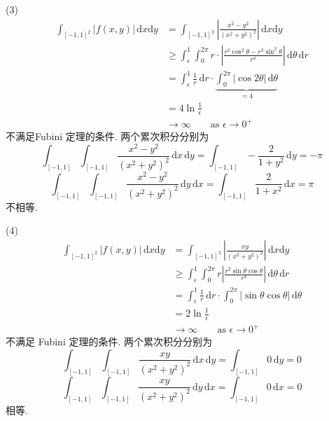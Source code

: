 (3)
\[
\begin{aligned}
\int_{[-1,1]^2}^{} \lvert f(x,y) \rvert  \, \mathrm{d}x \mathrm{d}y & =\int_{[-1,1]^2}^{} \left\lvert  \frac{x^2-y^2}{(x^2+y^2)^2}  \right\rvert  \, \mathrm{d}x \mathrm{d}y \\
 & \geq \int_{\epsilon}^{1} \int_{0}^{2\pi}   r \cdot \left\lvert  \frac{r^2\cos ^2\theta-r^2\sin ^2\theta}{r^{4}}  \right\rvert  \, \mathrm{d}\theta  \, \mathrm{d}r  \\
 & =\int_{\epsilon}^{1} \frac{1}{r} \, \mathrm{d}r \cdot\underbrace{  \int_{0}^{2\pi} \lvert \cos2\theta \rvert  \, \mathrm{d}\theta    }_{ =4  } \\
 & =4\ln\frac{1}{\epsilon} \\
 & \to \infty \qquad \text{as }\epsilon\to0^{+} 
\end{aligned} 
\]
不满足Fubini 定理的条件. 两个累次积分分别为
\[
\int_{[-1,1]}^{} \int_{[-1,1]}^{} \frac{x^2-y^2}{(x^2+y^2)^2} \, \mathrm{d}x  \, \mathrm{d}y =\int_{[-1,1]}^{} -\frac{2}{1+y^2} \, \mathrm{d}y= -\pi
\]
\[
\int_{[-1,1]}^{} \int_{[-1,1]}^{} \frac{x^2-y^2}{(x^2+y^2)^2} \, \mathrm{d}y  \, \mathrm{d}x=\int_{[-1,1]}^{} \frac{2}{1+x^2} \, \mathrm{d}x =\pi
\]
不相等.

(4)
\[
\begin{aligned}
\int_{[-1,1]^2}^{} \lvert f(x,y) \rvert  \, \mathrm{d}x \mathrm{d}y & =\int_{[-1,1]^2}^{} \left\lvert  \frac{xy}{(x^2+y^2)^2}  \right\rvert  \, \mathrm{d}x \mathrm{d}y \\
 & \geq \int_{\epsilon}^{1} \int_{0}^{2\pi} r\left\lvert  \frac{r^2\sin\theta \cos\theta}{r^{4}}  \right\rvert  \, \mathrm{d}\theta  \, \mathrm{d}r  \\
 & =\int_{\epsilon}^{1} \frac{1}{r} \, \mathrm{d}r \cdot \int_{0}^{2\pi} \lvert \sin\theta \cos\theta \rvert  \, \mathrm{d}\theta     \\
 & =2\ln\frac{1}{\epsilon} \\
 & \to \infty \qquad \text{as }\epsilon\to0^{+} 
\end{aligned}
\]
不满足 Fubini 定理的条件. 两个累次积分分别为
\[
\int_{[-1,1]}^{} \int_{[-1,1]}^{}  \frac{xy}{(x^2+y^2)^2}  \, \mathrm{d}x  \, \mathrm{d}y= \int_{[-1,1]}^{} 0 \, \mathrm{d}y=0
\]
\[
\int_{[-1,1]}^{} \int_{[-1,1]}^{}  \frac{xy}{(x^2+y^2)^2}  \, \mathrm{d}y  \, \mathrm{d}x= \int_{[-1,1]}^{} 0 \, \mathrm{d}x=0
\]
相等.

